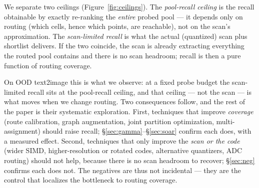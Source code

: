 \documentclass{article}
\begin{document}
We separate two ceilings (Figure~\ref{fig:ceilings}). The \emph{pool-recall ceiling} is the recall obtainable by
exactly re-ranking the \emph{entire} probed pool --- it depends only on routing
(which cells, hence which points, are reachable), not on the scan's approximation.
The \emph{scan-limited recall} is what the actual (quantized) scan plus shortlist
delivers. If the two coincide, the scan is already extracting everything the routed
pool contains and there is no scan headroom; recall is then a pure function of
routing coverage.

On OOD text2image this is what we observe: at a fixed probe budget the scan-limited
recall sits at the pool-recall ceiling, and that ceiling --- not the scan --- is what
moves when we change routing. Two consequences follow, and the rest of the paper is
their systematic exploration. First, techniques that improve \emph{coverage} (route
calibration, graph augmentation, joint partition optimization, multi-assignment)
should raise recall; \S\ref{sec:gamma}--\S\ref{sec:soar} confirm each does, with a
measured effect. Second, techniques that only improve the \emph{scan or the code}
(wider SIMD, higher-resolution or rotated codes, alternative quantizers, ADC routing)
should not help, because there is no scan headroom to recover; \S\ref{sec:neg}
confirms each does not. The negatives are thus not incidental --- they are the
control that localizes the bottleneck to routing coverage.
\end{document}
